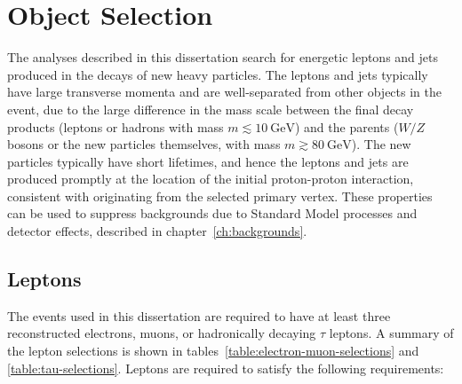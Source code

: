 \section{Object Selection}\label{sec:model-independent-object-definitions}
The analyses described in this dissertation search for energetic leptons and jets produced in the decays of new heavy particles. The leptons and jets typically have large transverse momenta and are well-separated from other objects in the event, due to the large difference in the mass scale between the final decay products (leptons or hadrons with mass $m\lesssim\SI{10}{\giga\electronvolt}$) and the parents ($W/Z$ bosons or the new particles themselves, with mass $m\gtrsim\SI{80}{\giga\electronvolt}$). The new particles typically have short lifetimes, and hence the leptons and jets are produced promptly at the location of the initial proton-proton interaction, consistent with originating from the selected primary vertex. These properties can be used to suppress backgrounds due to Standard Model processes and detector effects, described in chapter~\ref{ch:backgrounds}. 

\subsection{Leptons}\label{sec:model-independent-lepton-definitions}

The events used in this dissertation are required to have at least three reconstructed electrons, muons, or hadronically decaying $\tau$ leptons. A summary of the lepton selections is shown in tables~\ref{table:electron-muon-selections} and \ref{table:tau-selections}. Leptons are required to satisfy the following requirements:

